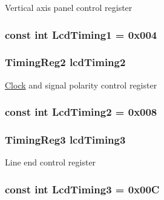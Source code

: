 \label{classPl111_a0d40494e71744c6ea4d0f71361a79716}
Vertical axis panel control register \hypertarget{classPl111_a310527f5b0ebff18e9d61839aaca448e}{
\subsubsection[{LcdTiming1}]{\setlength{\rightskip}{0pt plus 5cm}const int {\bf LcdTiming1} = 0x004}}
\label{classPl111_a310527f5b0ebff18e9d61839aaca448e}
\hypertarget{classPl111_a2f98cbb0ab28ad2c919d0e4f9287cb20}{
\subsubsection[{lcdTiming2}]{\setlength{\rightskip}{0pt plus 5cm}TimingReg2 {\bf lcdTiming2}}}
\label{classPl111_a2f98cbb0ab28ad2c919d0e4f9287cb20}
\hyperlink{classClock}{Clock} and signal polarity control register \hypertarget{classPl111_afddc0e26839afc83296ce772f7de493c}{
\subsubsection[{LcdTiming2}]{\setlength{\rightskip}{0pt plus 5cm}const int {\bf LcdTiming2} = 0x008}}
\label{classPl111_afddc0e26839afc83296ce772f7de493c}
\hypertarget{classPl111_a731c4b1e7fbe0aaf8b9f98989beda1c4}{
\subsubsection[{lcdTiming3}]{\setlength{\rightskip}{0pt plus 5cm}TimingReg3 {\bf lcdTiming3}}}
\label{classPl111_a731c4b1e7fbe0aaf8b9f98989beda1c4}
Line end control register \hypertarget{classPl111_ae9ebad3cdc05f8b4bd6d58f25671d432}{
\subsubsection[{LcdTiming3}]{\setlength{\rightskip}{0pt plus 5cm}const int {\bf LcdTiming3} = 0x00C}}
